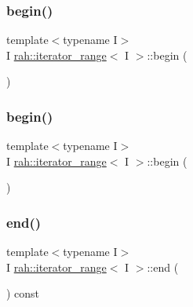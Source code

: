 \subsubsection{\texorpdfstring{begin()}{begin()}\hspace{0.1cm}{\footnotesize\ttfamily [3/4]}}
{\footnotesize\ttfamily template$<$typename I$>$ \\
I \mbox{\hyperlink{structrah_1_1iterator__range}{rah\+::iterator\+\_\+range}}$<$ I $>$\+::begin (\begin{DoxyParamCaption}{ }\end{DoxyParamCaption})\hspace{0.3cm}{\ttfamily [inline]}}

\mbox{\label{structrah_1_1iterator__range_a1281848b740db43274f5be412c1a83f4}} 
\subsubsection{\texorpdfstring{begin()}{begin()}\hspace{0.1cm}{\footnotesize\ttfamily [4/4]}}
{\footnotesize\ttfamily template$<$typename I$>$ \\
I \mbox{\hyperlink{structrah_1_1iterator__range}{rah\+::iterator\+\_\+range}}$<$ I $>$\+::begin (\begin{DoxyParamCaption}{ }\end{DoxyParamCaption})\hspace{0.3cm}{\ttfamily [inline]}}

\mbox{\label{structrah_1_1iterator__range_a8945eefba8353b52d0eaa97491d00ab3}} 
\subsubsection{\texorpdfstring{end()}{end()}\hspace{0.1cm}{\footnotesize\ttfamily [1/4]}}
{\footnotesize\ttfamily template$<$typename I$>$ \\
I \mbox{\hyperlink{structrah_1_1iterator__range}{rah\+::iterator\+\_\+range}}$<$ I $>$\+::end (\begin{DoxyParamCaption}{ }\end{DoxyParamCaption}) const\hspace{0.3cm}{\ttfamily [inline]}}

